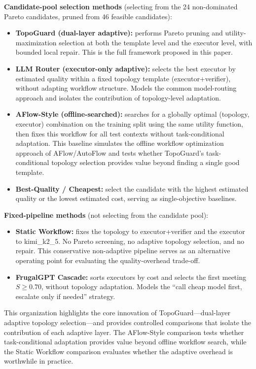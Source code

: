 \documentclass[manuscript,review,anonymous]{acmart}
\begin{document}
\textbf{Candidate-pool selection methods} (selecting from the 24 non-dominated Pareto candidates, pruned from 46 feasible candidates):
\begin{itemize}
    \item \textbf{TopoGuard (dual-layer adaptive):} performs Pareto pruning and utility-maximization selection at both the template level and the executor level, with bounded local repair. This is the full framework proposed in this paper.
    \item \textbf{LLM Router (executor-only adaptive):} selects the best executor by estimated quality within a fixed topology template (executor+verifier), without adapting workflow structure. Models the common model-routing approach and isolates the contribution of topology-level adaptation.
    \item \textbf{AFlow-Style (offline-searched):} searches for a globally optimal (topology, executor) combination on the training split using the same utility function, then fixes this workflow for all test contexts without task-conditional adaptation. This baseline simulates the offline workflow optimization approach of AFlow/AutoFlow and tests whether TopoGuard's task-conditional topology selection provides value beyond finding a single good template.
    \item \textbf{Best-Quality / Cheapest:} select the candidate with the highest estimated quality or the lowest estimated cost, serving as single-objective baselines.
\end{itemize}

\textbf{Fixed-pipeline methods} (not selecting from the candidate pool):
\begin{itemize}
    \item \textbf{Static Workflow:} fixes the topology to executor+verifier and the executor to kimi\_k2\_5. No Pareto screening, no adaptive topology selection, and no repair. This conservative non-adaptive pipeline serves as an alternative operating point for evaluating the quality-overhead trade-off.
    \item \textbf{FrugalGPT Cascade:} sorts executors by cost and selects the first meeting $S \geq 0.70$, without topology adaptation. Models the ``call cheap model first, escalate only if needed'' strategy.
\end{itemize}

This organization highlights the core innovation of TopoGuard---dual-layer adaptive topology selection---and provides controlled comparisons that isolate the contribution of each adaptive layer. The AFlow-Style comparison tests whether task-conditional adaptation provides value beyond offline workflow search, while the Static Workflow comparison evaluates whether the adaptive overhead is worthwhile in practice.
\end{document}
